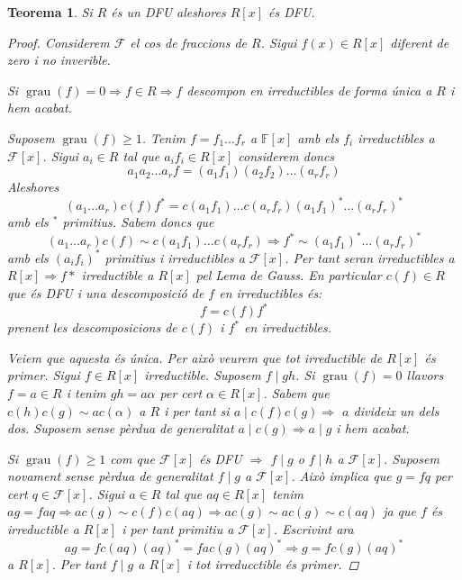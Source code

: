 \documentclass[a4paper,11pt]{report}
\renewcommand{\div}{\mid}
\DeclareMathOperator{\grau}{grau}
\newcommand{\im}{\Rightarrow}
\theoremstyle{theorem}
\newtheorem{teorema}{\normalfont \sffamily\bfseries Teorema}[section]
\theoremstyle{definition}
\begin{document}
\begin{teorema}
	Si $R$ és un DFU aleshores $R[x]$ és DFU.
	\begin{proof}
	Considerem $\mathcal{F}$ el cos de fraccions de $R$. Sigui $f(x)\in R[x]$ diferent de zero i no inverible.
	
	Si $\grau(f)=0\im f\in R\im f$ descompon en irreductibles de forma única a $R$ i hem acabat.

	Suposem $\grau(f)\geq 1$. Tenim $f=f_1\ldots f_r$ a $\mathbb{F}[x]$ amb els $f_i$ irreductibles a $\mathcal{F}[x]$.
	Sigui $a_i\in R$ tal que $a_if_i\in R[x]$ considerem doncs
	$$a_1a_2\ldots a_r f=(a_1 f_1)(a_2f_2)\ldots(a_rf_r)$$ Aleshores $$(a_1\ldots a_r)c(f)f^*=c(a_1f_1)\ldots c(a_r f_r)(a_1f_1)^*\ldots (a_rf_r)^*$$
	amb els $^*$ primitius. Sabem doncs que $$(a_1\ldots a_r)c(f)\sim c(a_1f_1)\ldots c(a_r f_r)\im f^*\sim(a_1f_1)^*\ldots (a_rf_r)^*$$
	amb els $(a_if_i)^*$ primitius i irreductibles a $\mathcal{F}[x]$. Per tant seran irreductibles a $R[x]\im f*$ irreductible a $R[x]$ pel Lema de Gauss. En particular $c(f)\in R$ que és DFU i una descomposició de $f$ en irreductibles és:
	$$f=c(f)f^*$$ prenent les descomposicions de $c(f)$ i $f^*$ en irreductibles.
	
	Veiem que aquesta és única. Per això veurem que tot irreductible de $R[x]$ és primer. Sigui $f\in R[x]$ irreductible. Suposem $f\div gh$. Si $\grau(f)=0$ llavors $f=a\in R$ i tenim $gh=a\alpha$ per cert $\alpha\in R[x]$. Sabem que $c(h)c(g)\sim ac(\alpha)$ a $R$ i per tant si $a\div c(f)c(g)\im$ $a$ divideix un dels dos. Suposem sense pèrdua de generalitat $a\div c(g)\im a\div g$ i hem acabat.
	
	Si $\grau(f)\geq 1$ com que $\mathcal{F}[x]$ és DFU $\im$ $f\div g$ o $f\div h$ a $\mathcal{F}[x]$. Suposem novament sense pèrdua de generalitat $f\div g$ a $\mathcal{F}[x]$. Això implica que $g=fq$ per cert $q\in \mathcal{F}[x]$. Sigui $a\in R$ tal que $aq\in R[x]$ tenim $ag=faq\im a c(g)\sim c(f)c(aq)\im ac(g)\sim ac(g)\sim c(aq)$ ja que $f$ és irreductible a $R[x]$ i per tant primitiu a $\mathcal{F}[x]$. Escrivint ara
	$$ag=fc(aq)(aq)^*=fac(g)(aq)^*\im g=fc(g)(aq)^*$$ a $R[x]$. Per tant $f\div g$ a $R[x]$ i tot irreducctible és primer.
\end{proof}
\end{teorema}
\end{document}
